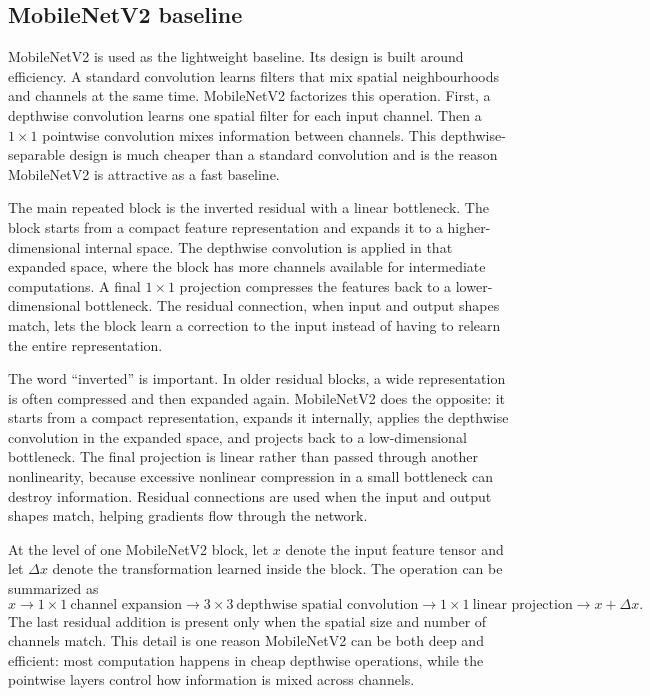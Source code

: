 \documentclass[11pt,a4paper]{article}
\begin{document}
\subsection{MobileNetV2 baseline}

MobileNetV2 is used as the lightweight baseline.
Its design is built around efficiency. A standard convolution learns filters
that mix spatial neighbourhoods and channels at the same time. MobileNetV2
factorizes this operation. First, a depthwise convolution learns one spatial
filter for each input channel. Then a \(1\times1\) pointwise convolution mixes
information between channels. This depthwise-separable design is much cheaper
than a standard convolution and is the reason MobileNetV2 is attractive as a
fast baseline.

The main repeated block is the inverted residual with a linear bottleneck.
The block starts from a compact feature representation and expands it to a
higher-dimensional internal space. The depthwise convolution is applied in
that expanded space, where the block has more channels available for
intermediate computations. A final \(1\times1\) projection compresses the
features back to a lower-dimensional bottleneck. The residual connection,
when input and output shapes match, lets the block learn a correction to the
input instead of having to relearn the entire representation.

The word ``inverted'' is important. In older residual blocks, a wide
representation is often compressed and then expanded again. MobileNetV2 does
the opposite: it starts from a compact representation, expands it internally,
applies the depthwise convolution in the expanded space, and projects back to a
low-dimensional bottleneck. The final projection is linear rather than passed
through another nonlinearity, because excessive nonlinear compression in a
small bottleneck can destroy information. Residual connections are used when
the input and output shapes match, helping gradients flow through the network.

At the level of one MobileNetV2 block, let \(x\) denote the input feature
tensor and let \(\Delta x\) denote the transformation learned inside the
block. The operation can be summarized as
\[
  x
  \rightarrow
  1{\times}1\ \text{channel expansion}
  \rightarrow
  3{\times}3\ \text{depthwise spatial convolution}
  \rightarrow
  1{\times}1\ \text{linear projection}
  \rightarrow
  x+\Delta x .
\]
The last residual addition is present only when the spatial size and number of
channels match. This detail is one reason MobileNetV2 can be both deep and
efficient: most computation happens in cheap depthwise operations, while the
pointwise layers control how information is mixed across channels.
\end{document}
